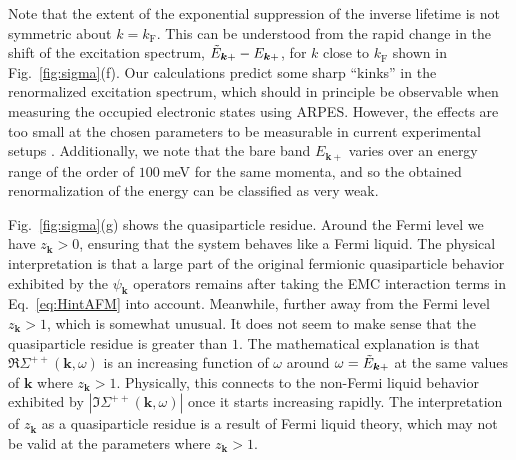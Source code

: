 \documentclass[aps, prb, twocolumn,amsmath,amssymb,floatfix]{revtex4-2}
\begin{document}
Note that the extent of the exponential suppression of the inverse lifetime is not symmetric about $k = k_{\textrm{F}}$. This can be understood from the rapid change in the shift of the excitation spectrum, $\Tilde{E}_{\boldsymbol{k}+}-E_{\boldsymbol{k}+}$, for $k$ close to $k_{\textrm{F}}$ shown in Fig.~\ref{fig:sigma}(f). Our calculations predict some sharp ``kinks'' in the renormalized excitation spectrum, which should in principle be observable when measuring the occupied electronic states using ARPES. However, the effects are too small at the chosen parameters to be measurable in current experimental setups \cite{Claessen2004, Claessen2009, Borisenko2012one, Rosenzweig2020overdoping, Iwasawa2020high, Tamai2013spin, Rosenzweig2019tuning}. 
Additionally, we note that the bare band $E_{\boldsymbol{k}+}$ varies over an energy range of the order of $100~$meV for the same momenta, and so the obtained renormalization of the energy can be classified as very weak.

Fig.~\ref{fig:sigma}(g) shows the quasiparticle residue. 
Around the Fermi level we have $z_{\boldsymbol{k}} > 0$, ensuring that the system behaves like a Fermi liquid. The physical interpretation is that a large part of the original fermionic quasiparticle behavior exhibited by the $\psi_{\boldsymbol{k}}$ operators remains after taking the EMC interaction terms in Eq.~\eqref{eq:HintAFM} into account. Meanwhile, further away from the Fermi level $z_{\boldsymbol{k}} > 1$, which is somewhat unusual. It does not seem to make sense that the quasiparticle residue is greater than $1$. The mathematical explanation is that $\Re\Sigma^{++}(\boldsymbol{k}, \omega)$ is an increasing function of $\omega$ around $\omega = \Tilde{E}_{\boldsymbol{k}+} $ at the same values of $\boldsymbol{k}$ where $z_{\boldsymbol{k}} > 1$. Physically, this connects to the non-Fermi liquid behavior exhibited by $|\Im\Sigma^{++}(\boldsymbol{k}, \omega)|$ once it starts increasing rapidly.  The interpretation of $z_{\boldsymbol{k}}$ as a quasiparticle residue is a result of Fermi liquid theory, which may not be valid at the parameters where $z_{\boldsymbol{k}} > 1$.
\end{document}
